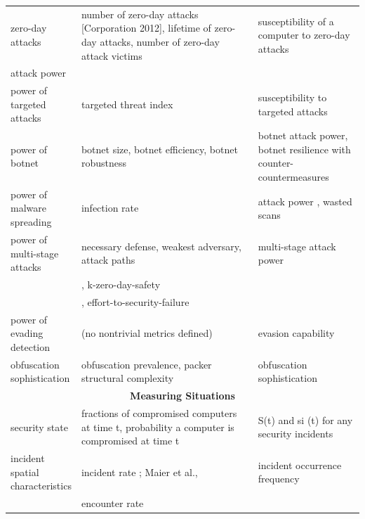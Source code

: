 \begin{tiny}
\begin{longtable}{@{}|p{0.2\linewidth}|p{0.5\linewidth}|p{0.3\linewidth}|@{}}
zero-day attacks & number of zero-day attacks {[}Corporation 2012{]}, lifetime of zero-day attacks\cite{Bilge_Dumitras_2012}, number of zero-day attack victims \cite{Bilge_Dumitras_2012}& susceptibility of a computer to zero-day attacks \\
attack power &  &  \\
power of targeted attacks & targeted threat index\cite{Hardy_Crete-Nishihata_Kleemola_Senft_Sonne_Wiseman_Gill_Deibert_2014} & susceptibility to targeted attacks \\
power of botnet & botnet size\cite{Dagon_Zou_Lee_2006}, botnet efficiency\cite{Dagon_Gu_Lee_Lee_2007}, botnet robustness\cite{Dagon_Gu_Lee_Lee_2007} & botnet attack power, botnet resilience with counter-countermeasures \\
power of malware spreading & infection rate\cite{Chen_Ji_2007} & attack power , wasted scans \\
power of multi-stage attacks & necessary defense\cite{Sheyner_Haines_Jha_Lippmann_Wing_2002}, weakest adversary\cite{Pamula_Jajodia_Ammann_Swarup_2006}, attack paths & multi-stage attack power \\
 & \cite{Ritchey_Ammann_2000,  Sheyner_Haines_Jha_Lippmann_Wing_2002, Jha_Sheyner_Wing_2002, Cheng_Deng_Li_DeLoach_Singhal_Ou_2014}, k-zero-day-safety &  \\
 & \cite{Wang_Jajodia_Singhal_Noel_2010}, effort-to-security-failure\cite{Dacier_Deswarte_Kaaniche, Ortalo_1999} &  \\
power of evading detection & (no nontrivial metrics defined) & evasion capability \\
obfuscation sophistication & obfuscation prevalence\cite{Roundy_Miller_2013}, packer structural complexity\cite{Ugarte-Pedrero_Balzarotti_Santos_Bringas_2015} & obfuscation sophistication \\* \midrule
 \multicolumn{3}{c}{\textbf{Measuring Situations}} \\* \midrule
security state & fractions of compromised computers at time t, probability a computer is compromised at time t\cite{LeMay_Ford_Keefe_Sanders_Muehrcke_2011, Da_Xu_Xu_2014, Xu_2014a} & S(t) and si (t) for any security incidents   \\
incident spatial characteristics & incident rate \cite{Microsoft_2013, Yen_Heorhiadi_Oprea_Reiter_Juels_2014, levesque2013a}; Maier et al., & incident occurrence frequency \\
 & encounter rate\cite{Yen_Heorhiadi_Oprea_Reiter_Juels_2014,Mezzour_Carley_Carley_2015, Microsoft_2013,levesque2013a} &  \\

\end{longtable}
\end{tiny}
